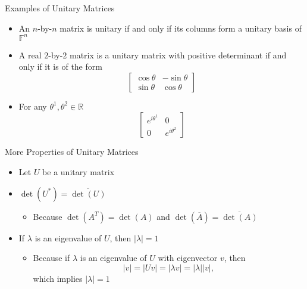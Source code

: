 \documentclass[usenames,dvipsnames,10pt]{beamer}
\newcommand\F{\mathbb{F}}
\newcommand{\R}{\mathbb{R}}
\begin{document}
\begin{frame}
  {Examples of Unitary Matrices}

  \begin{itemize}
  \item An $n$-by-$n$ matrix is unitary if and only if its columns form a unitary basis of $\F^n$
  \item A real $2$-by-$2$ matrix is a unitary matrix with positive determinant if and only if it is of the form
    \[
      \begin{bmatrix}
        \cos\theta & -\sin\theta \\ \sin\theta & \cos\theta
      \end{bmatrix}
    \]
  \item For any $\theta^1,\theta^2 \in \R$
    \[
      \begin{bmatrix}
        e^{i\theta^1} & 0 \\ 0 & e^{i\theta^2}
      \end{bmatrix}
    \]
  \end{itemize}
\end{frame}

\begin{frame}
  {More Properties of Unitary Matrices}

  \begin{itemize}
  \item Let $U$ be a unitary matrix
  \item $\det(U^*) = \overline{\det(U)}$
    \begin{itemize}
    \item Because $\det(A^T) = \det(A)$ and $\det(\overline{A}) = \overline{\det(A)}$
    \end{itemize}
  \item If $\lambda$ is an eigenvalue of $U$, then $|\lambda| = 1$
    \begin{itemize}
    \item Because if $\lambda$ is an eigenvalue of $U$ with eigenvector $v$, then
      \[
        |v| = |Uv| = |\lambda v| = |\lambda||v|,
      \]
      which implies $|\lambda|=1$
    \end{itemize}
  \end{itemize}
\end{frame}
\end{document}
